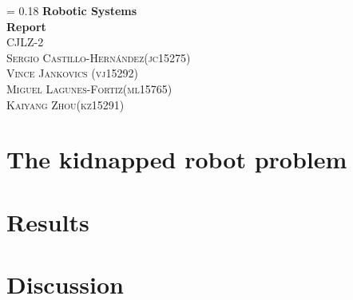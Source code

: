 \documentclass[12pt,a4paper]{article}
\newcommand{\ass}{Robotic Systems\\ Report}
\newcommand{\name}{ CJLZ-2\\Sergio Castillo-Hernández(jc15275)\\ Vince Jankovics (vj15292)\\ Miguel Lagunes-Fortiz(ml15765)\\ Kaiyang Zhou(kz15291)}
\newcommand*{\titleM}{
\thispagestyle{empty}
\newlength{\drop}
\begingroup%


\drop = 0.18\textheight
\centering
\vspace*{\drop}
\vspace*{\drop}
{\Huge\bfseries \ass}\\[\baselineskip]
{\large\scshape \name}\par
\vfill
\endgroup

\thispagestyle{empty}
\makebox[\textwidth]{}
\pagebreak
\makebox[\textwidth]{}
\setcounter{page}{0}
}
\begin{document}
	\titleM
	
	
		
	
	
	
		
	\section{The kidnapped robot problem}
		
		
		
		
		
		
 	
 	\section{Results}
 	
 		
 		
		
 		
 	\section{Discussion}
 
 
 
 \printbibliography
 
 
 		 	
	 	
\end{document}

